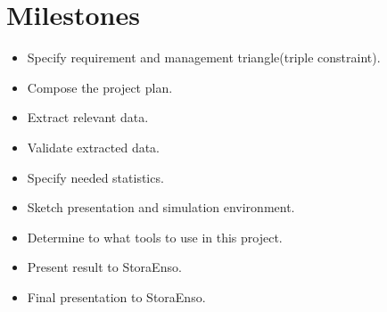 \documentclass{article}
\begin{document}
\section{Milestones}
\begin{itemize}
    \item
	Specify requirement and management triangle(triple constraint).
    \item
	Compose the project plan.
    \item
	Extract relevant data.
    \item
	Validate extracted data.
    \item
	Specify needed statistics.
    \item
	Sketch presentation and simulation environment.
    \item
	Determine to what tools to use in this project.
    \item
	Present result to StoraEnso.
    \item
	Final presentation to StoraEnso.
\end{itemize}
\end{document}
